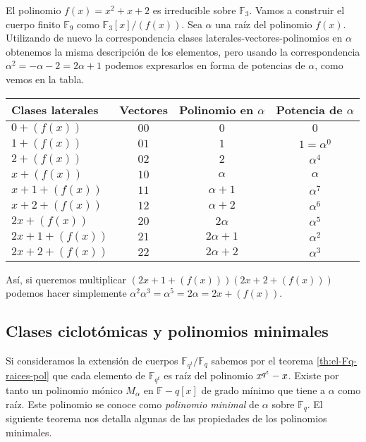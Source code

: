 \begin{example}
  El polinomio \(f(x) = x^2 + x + 2\) es irreducible sobre \(\mathbb F_3\).
  Vamos a construir el cuerpo finito \(\mathbb F_9\) como \(\mathbb F_3[x]/(f(x))\).
  Sea \(\alpha\) una raíz del polinomio \(f(x)\).
  Utilizando de nuevo la correspondencia clases laterales-vectores-polinomios en \(\alpha\) obtenemos la misma descripción de los elementos, pero usando la correspondencia \(\alpha^2 = -\alpha - 2 = 2\alpha + 1\) podemos expresarlos en forma de potencias de \(\alpha\), como vemos en la tabla.
  \begin{table}[h]
    \centering
    \sffamily
    \begin{tabular}{lccc}
      \toprule
      Clases laterales & Vectores & Polinomio en \(\alpha\) & Potencia de \(\alpha\)\\
      \midrule
      \(0 + (f(x))\) & \(00\) & \(0\) & \(0\)\\
      \(1 + (f(x))\) & \(01\) & \(1\) & \(1 = \alpha^0\)\\
      \(2 + (f(x))\) & \(02\) & \(2\) & \(\alpha^4\)\\
      \(x + (f(x))\) & \(10\) & \(\alpha\) & \(\alpha\)\\
      \(x + 1 + (f(x))\) & \(11\) & \(\alpha + 1\) & \(\alpha^7\)\\
      \(x + 2 + (f(x))\) & \(12\) & \(\alpha + 2\) & \(\alpha^6\)\\
      \(2x + (f(x))\) & \(20\) & \(2\alpha\) & \(\alpha^5\)\\
      \(2x + 1 + (f(x))\) & \(21\) & \(2\alpha + 1\) & \(\alpha^2\)\\
      \(2x + 2 + (f(x))\) & \(22\) & \(2\alpha + 2\) & \(\alpha^3\)\\
      \bottomrule
    \end{tabular}
  \end{table}

  Así, si queremos multiplicar \((2x + 1 + (f(x)))(2x + 2 + (f(x)))\) podemos hacer simplemente \(\alpha^2 \alpha^3 = \alpha^5 = 2\alpha = 2x + (f(x))\).
\end{example}


\subsection{Clases ciclotómicas y polinomios minimales}

Si consideramos la extensión de cuerpos \(\mathbb F_{q^t}/\mathbb F_q\) sabemos por el teorema \ref{th:el-Fq-raices-pol} que cada elemento de \(\mathbb F_{q^t}\) es raíz del polinomio \(\cramped{x^{q^t}} - x\).
Existe por tanto un polinomio mónico \(M_{\alpha}\) en \(\mathbb F-q[x]\) de grado mínimo que tiene a \(\alpha\) como raíz.
Este polinomio se conoce como \emph{polinomio minimal} de \(\alpha\) sobre \(\mathbb F_q\).
El siguiente teorema nos detalla algunas de las propiedades de los polinomios minimales.


